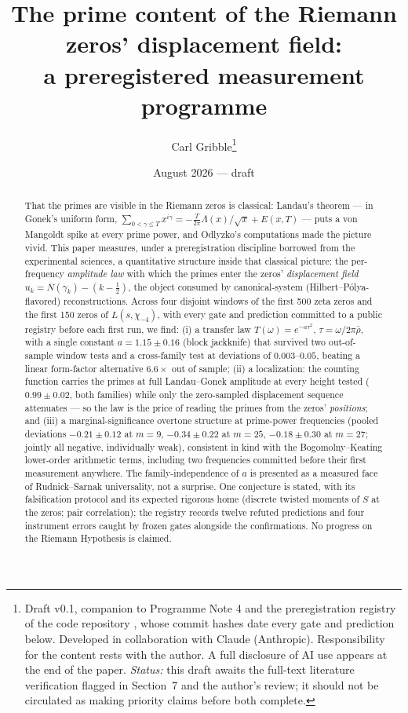 \documentclass[11pt]{article}
\title{The prime content of the Riemann zeros' displacement field:\\
a preregistered measurement programme}
\author{Carl Gribble\thanks{Draft v0.1, companion to Programme Note 4 \cite{Note4} and the
preregistration registry of the code repository \cite{Code}, whose commit hashes date every gate
and prediction below. Developed in collaboration with Claude (Anthropic). Responsibility for the
content rests with the author. A full disclosure of AI use appears at the end of the paper.
\emph{Status:} this draft awaits the full-text literature verification flagged in Section~7 and
the author's review; it should not be circulated as making priority claims before both complete.}}
\date{August 2026 --- draft}
\theoremstyle{definition}
\theoremstyle{remark}
\newcommand{\Nbar}{\overline{N}}
\begin{document}
\maketitle

\begin{abstract}
That the primes are visible in the Riemann zeros is classical: Landau's theorem --- in Gonek's
uniform form, $\sum_{0<\gamma\le T} x^{i\gamma} = -\tfrac{T}{2\pi}\Lambda(x)/\sqrt{x} + E(x,T)$ ---
puts a von Mangoldt spike at every prime power, and Odlyzko's computations made the picture vivid.
This paper measures, under a preregistration discipline borrowed from the experimental sciences,
a quantitative structure inside that classical picture: the per-frequency \emph{amplitude law} with
which the primes enter the zeros' \emph{displacement field} $u_k = \Nbar(\gamma_k) - (k - \tfrac12)$,
the object consumed by canonical-system (Hilbert--P\'olya-flavored) reconstructions. Across four
disjoint windows of the first 500 zeta zeros and the first 150 zeros of $L(s,\chi_{-4})$, with
every gate and prediction committed to a public registry before each first run, we find:
(i) a transfer law $T(\omega) = e^{-a\tau^2}$, $\tau = \omega/2\pi\bar\rho$, with a single constant
$a = 1.15 \pm 0.16$ (block jackknife) that survived two out-of-sample window tests and a
cross-family test at deviations of $0.003$--$0.05$, beating a linear form-factor alternative
$6.6\times$ out of sample; (ii) a localization: the counting function carries the primes at full
Landau--Gonek amplitude at every height tested ($0.99 \pm 0.02$, both families) while only the
zero-sampled displacement sequence attenuates --- so the law is the price of reading the primes from
the zeros' \emph{positions}; and (iii) a marginal-significance overtone structure at prime-power
frequencies (pooled deviations $-0.21 \pm 0.12$ at $m = 9$, $-0.34 \pm 0.22$ at $m = 25$,
$-0.18 \pm 0.30$ at $m = 27$; jointly all negative, individually weak), consistent in kind with the
Bogomolny--Keating lower-order arithmetic terms, including two frequencies committed before their
first measurement anywhere. The family-independence of $a$ is presented as a measured face of
Rudnick--Sarnak universality, not a surprise. One conjecture is stated, with its falsification
protocol and its expected rigorous home (discrete twisted moments of $S$ at the zeros; pair
correlation); the registry records twelve refuted predictions and four instrument errors caught by
frozen gates alongside the confirmations. No progress on the Riemann Hypothesis is claimed.
\end{abstract}
\end{document}
